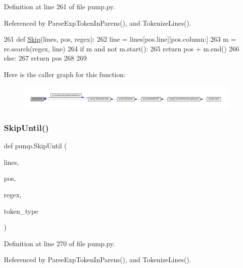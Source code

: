 Definition at line 261 of file pump.\+py.



Referenced by Parse\+Exp\+Token\+In\+Parens(), and Tokenize\+Lines().


\begin{DoxyCode}
261 \textcolor{keyword}{def }\hyperlink{namespacepump_a869bd8932d9ee97f3a0e789abd05d590}{Skip}(lines, pos, regex):
262   line = lines[pos.line][pos.column:]
263   m = re.search(regex, line)
264   \textcolor{keywordflow}{if} m \textcolor{keywordflow}{and} \textcolor{keywordflow}{not} m.start():
265     \textcolor{keywordflow}{return} pos + m.end()
266   \textcolor{keywordflow}{else}:
267     \textcolor{keywordflow}{return} pos
268 
269 
\end{DoxyCode}
Here is the caller graph for this function\+:
\nopagebreak
\begin{figure}[H]
\begin{center}
\leavevmode
\includegraphics[width=350pt]{namespacepump_a869bd8932d9ee97f3a0e789abd05d590_icgraph}
\end{center}
\end{figure}
\mbox{\label{namespacepump_a8935d04d89047866b07c59845e2d7d29}} 
\subsubsection{\texorpdfstring{Skip\+Until()}{SkipUntil()}}
{\footnotesize\ttfamily def pump.\+Skip\+Until (\begin{DoxyParamCaption}\item[{}]{lines,  }\item[{}]{pos,  }\item[{}]{regex,  }\item[{}]{token\+\_\+type }\end{DoxyParamCaption})}



Definition at line 270 of file pump.\+py.



Referenced by Parse\+Exp\+Token\+In\+Parens(), and Tokenize\+Lines().



